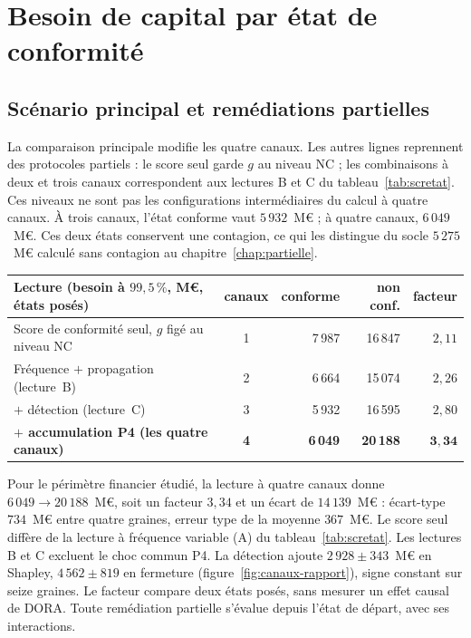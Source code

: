 \section{Besoin de capital par état de conformité}

\subsection*{Scénario principal et remédiations partielles}
\label{sec:chiffre-de-tete}

La comparaison principale modifie les quatre canaux. Les autres lignes reprennent des protocoles
partiels : le score seul garde $g$ au niveau NC ; les combinaisons à deux et trois canaux
correspondent aux lectures B et C du tableau~\ref{tab:scretat}.
Ces niveaux ne sont pas les configurations intermédiaires du calcul à quatre canaux.
À trois canaux, l'état conforme vaut $5\,932$~M\euro{} ; à quatre
canaux, $6\,049$~M\euro{}. Ces deux états conservent une contagion, ce qui les distingue du
socle $5\,275$~M\euro{} calculé sans contagion au chapitre~\ref{chap:partielle}.

\begin{center}\footnotesize
\renewcommand{\arraystretch}{1.25}
\begin{tabular}{@{}l c r r r@{}}
\toprule
\textbf{Lecture} (besoin à $99{,}5\,\%$, M\euro, états posés) & \textbf{canaux} & \textbf{conforme} & \textbf{non conf.} & \textbf{facteur} \\
\midrule
Score de conformité seul, $g$ figé au niveau NC & 1 & 7\,987 & 16\,847 & $2{,}11$ \\
Fréquence $+$ propagation (lecture~B) & 2 & 6\,664 & 15\,074 & $2{,}26$ \\
$+$ détection (lecture~C) & 3 & 5\,932 & 16\,595 & $2{,}80$ \\
\textbf{$+$ accumulation P4 (les quatre canaux)} & \textbf{4} & \textbf{6\,049} & \textbf{20\,188}
& $\mathbf{3{,}34}$ \\
\bottomrule
\end{tabular}
\end{center}

\vspace{4pt}
\noindent Pour le périmètre financier étudié, la lecture à quatre canaux donne
$6\,049\to20\,188$~M\euro, soit un facteur $3{,}34$ et un écart de $14\,139$~M\euro{} : écart-type
$734$~M\euro{} entre quatre graines, erreur type de la moyenne $367$~M\euro.
Le score seul diffère de la lecture à fréquence variable (A) du tableau~\ref{tab:scretat}.
Les lectures B et C excluent le choc commun P4. La détection ajoute $2\,928\pm343$~M\euro{}
en Shapley, $4\,562\pm819$ en fermeture (figure~\ref{fig:canaux-rapport}), signe constant sur seize graines.
Le facteur compare deux états posés, sans mesurer un effet causal de DORA. Toute remédiation
partielle s'évalue depuis l'état de départ, avec ses interactions.

